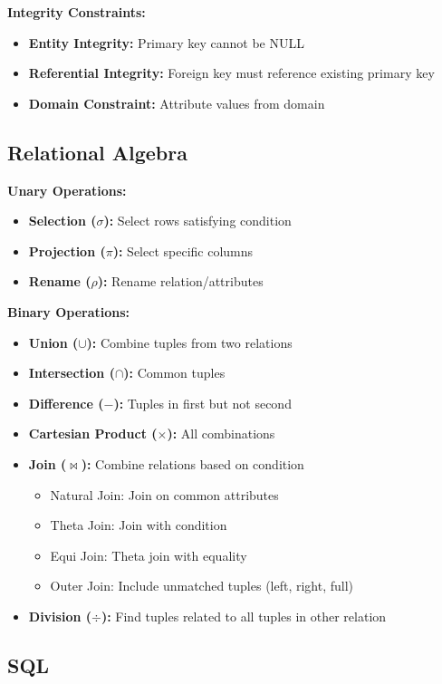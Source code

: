 \documentclass[11pt,a4paper]{article}
\begin{document}
\textbf{Integrity Constraints:}
\begin{itemize}
    \item \textbf{Entity Integrity:} Primary key cannot be NULL
    \item \textbf{Referential Integrity:} Foreign key must reference existing primary key
    \item \textbf{Domain Constraint:} Attribute values from domain
\end{itemize}

\subsection{Relational Algebra}

\textbf{Unary Operations:}
\begin{itemize}
    \item \textbf{Selection ($\sigma$):} Select rows satisfying condition
    \item \textbf{Projection ($\pi$):} Select specific columns
    \item \textbf{Rename ($\rho$):} Rename relation/attributes
\end{itemize}

\textbf{Binary Operations:}
\begin{itemize}
    \item \textbf{Union ($\cup$):} Combine tuples from two relations
    \item \textbf{Intersection ($\cap$):} Common tuples
    \item \textbf{Difference ($-$):} Tuples in first but not second
    \item \textbf{Cartesian Product ($\times$):} All combinations
    \item \textbf{Join ($\bowtie$):} Combine relations based on condition
    \begin{itemize}
        \item Natural Join: Join on common attributes
        \item Theta Join: Join with condition
        \item Equi Join: Theta join with equality
        \item Outer Join: Include unmatched tuples (left, right, full)
    \end{itemize}
    \item \textbf{Division ($\div$):} Find tuples related to all tuples in other relation
\end{itemize}

\subsection{SQL}
\end{document}
